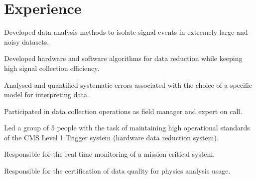 \documentclass[a4paper]{deedy-resume} %
\begin{document}
\begin{minipage}[t]{0.62\textwidth} %


\section{Experience}


\vspace{\topsep} %
\begin{tightitemize}
\item Developed data analysis methods to isolate signal events in extremely large and noisy datasets.
\item Developed hardware and software algorithms for data reduction while keeping high signal collection efficiency.
\item Analysed and quantified systematic errors associated with the choice of a specific model for interpreting data.
\item Participated in data collection operations as field manager and expert on call.
\end{tightitemize}

\sectionspace %



\begin{tightitemize}
\item Led a group of 5 people with the task of maintaining high operational standards of the CMS Level 1 Trigger system (hardware data reduction system). 
\item Responsible for the real time monitoring of a mission critical system.
\item Responsible for the certification of data quality for physics analysis usage.
\end{tightitemize}


\end{minipage}
\end{document}
